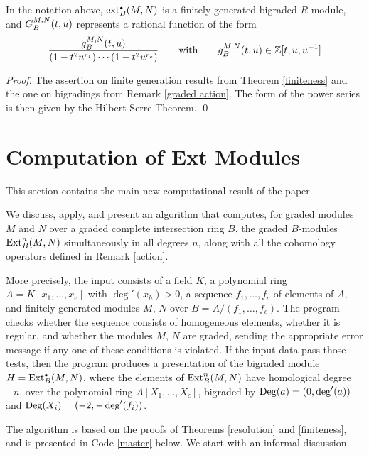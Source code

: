 \begin{corollary}
\label{series}
In the notation above, $\operatorname{ext}^{\scriptscriptstyle\bullet}_B(M,N)$ is a finitely generated
bigraded $R$-module, and ${G}_B^{M,N}(t,u)$ represents a rational
function of the form
\begin{equation*}
\frac{g_B^{M,N}(t,u)}{(1-t^2u^{r_1})\cdots(1-t^2u^{r_c})}
\qquad\text{with}\qquad g_B^{M,N}(t,u)\in{\mathbb Z}[t,u,u^{-1}]
\end{equation*}
\end{corollary}

\begin{proof}
The assertion on finite generation results from Theorem
\ref{finiteness} and the one on bigradings from Remark \ref{graded
action}.  The form of the power series is then given by the
Hilbert-Serre Theorem. \qed
 \end{proof}

\section{Computation of Ext Modules}
\label{Computation of Ext modules}

This section contains the main new computational result of the paper.

We discuss, apply, and present an algorithm that computes, for graded
modules $M$ and $N$ over a graded complete intersection ring $B$, the
graded $B$-modules $\operatorname{Ext}^n_B(M,N)$ simultaneously in all degrees $n$,
along with all the cohomology operators defined in Remark
\ref{action}.

More precisely, the input consists of a field $K$, a polynomial ring
$A=K[x_1,\dots,x_e]$ with $\deg'(x_h)>0$, a sequence $f_1,\dots,f_c$ of
elements of $A$, and finitely generated modules $M$, $N$ over
$B=A/(f_1,\dots,f_c)$.  The program checks whether the sequence
consists of homogeneous elements, whether it is regular, and whether
the modules $M$, $N$ are graded, sending the appropriate error message
if any one of these conditions is violated.  If the input data pass
those tests, then the program produces a presentation of the bigraded
module $H=\operatorname{Ext}^{\scriptscriptstyle\bullet}_B(M,N)$, where the elements of $\operatorname{Ext}^n_B(M,N)$ have
homological degree $-n$, over the polynomial ring $A[X_1,\dots,X_c]$,
bigraded by $\operatorname{Deg}(a)=(0,\deg'(a))$ and $\operatorname{Deg}(X_i)=(-2,-\deg'(f_i))$.

The algorithm is based on the proofs of Theorems \ref{resolution} and
\ref{finiteness}, and is presented in Code \ref{master} below.  We
start with an informal discussion.

